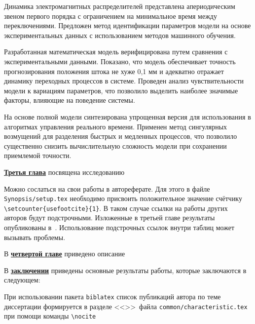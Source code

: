 Динамика электромагнитных распределителей представлена апериодическим
звеном первого порядка с ограничением на минимальное время между переключениями.
Предложен метод идентификации параметров модели на основе экспериментальных
данных с использованием методов машинного обучения.

Разработанная математическая модель верифицирована путем сравнения
с экспериментальными данными. Показано, что модель обеспечивает
точность прогнозирования положения штока не хуже 0,1 мм и адекватно
отражает динамику переходных процессов в системе. Проведен
анализ чувствительности модели к вариациям параметров, что позволило выделить
наиболее значимые факторы, влияющие на поведение системы.

На основе полной модели синтезирована упрощенная версия для использования в
алгоритмах управления реального времени. Применен метод сингулярных
возмущений для разделения быстрых и медленных процессов, что позволило
существенно снизить вычислительную сложность модели при сохранении приемлемой точности.

\underline{\textbf{Третья глава}} посвящена исследованию

Можно сослаться на свои работы в автореферате. Для этого в файле
\verb!Synopsis/setup.tex! необходимо присвоить положительное значение
счётчику \verb!\setcounter{usefootcite}{1}!. В таком случае ссылки на
работы других авторов будут подстрочными.
Изложенные в третьей главе результаты опубликованы в~\cite{vakbib1, vakbib2}.
Использование подстрочных ссылок внутри таблиц может вызывать проблемы.

В \underline{\textbf{четвертой главе}} приведено описание

\FloatBarrier
{}                                  %
В \underline{\textbf{заключении}} приведены основные результаты работы, которые заключаются в следующем:


При использовании пакета \verb!biblatex! список публикаций автора по теме
диссертации формируется в разделе <<\publications>>\ файла
\verb!common/characteristic.tex!  при помощи команды \verb!\nocite!

